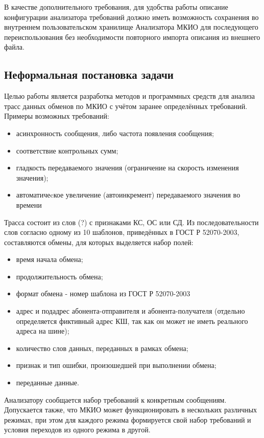 В качестве дополнительного требования, для удобства работы описание 
конфигурации анализатора требований должно иметь возможность сохранения во 
внутреннем пользовательском хранилище Анализатора МКИО для последующего 
переиспользования без необходимости повторного импорта описания из внешнего 
файла.


\iffalse
\subsection{Неформальная постановка задачи}

Целью работы является разработка методов и программных средств для 
анализа трасс данных обменов по МКИО с учётом заранее определённых требований. 
Примеры возможных требований:

\begin{itemize}
 \item асинхронность сообщения, либо частота появления сообщения;
 \item соответствие контрольных сумм;
 \item гладкость передаваемого значения (ограничение на скорость изменения 
значения);
 \item автоматичеcкое увеличение (автоинкремент) передаваемого значения во 
времени
\end{itemize}

Трасса состоит из слов (?) с признаками КС, ОС или СД. Из последовательности 
слов согласно одному из 10 шаблонов, приведённых в ГОСТ Р 52070-2003, 
составляются обмены, для которых выделяется набор полей:

\begin{itemize}
 \item время начала обмена;
 \item продолжительность обмена;
 \item формат обмена - номер шаблона из ГОСТ Р 52070-2003
 \item адрес и подадрес абонента-отправителя и абонента-получателя (отдельно 
определяется фиктивный адрес КШ, так как он может не иметь реального адреса на 
шине);
 \item количество слов данных, переданных в рамках обмена;
 \item признак и тип ошибки, произошедшей при выполнении обмена;
 \item переданные данные.
\end{itemize}

Анализатору сообщается набор требований к конкретным сообщениям. 
Допускается также, что МКИО может функционировать в нескольких различных 
режимах, при этом для каждого режима формируется свой набор требований и 
условия переходов из одного режима в другой.

